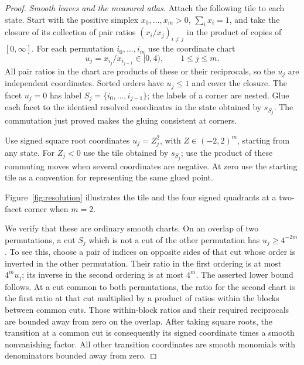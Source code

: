 \begin{proof}
\medskip\noindent\emph{Smooth leaves and the measured atlas.}
Attach the following tile to each state.  Start with the positive
simplex \(x_0,\ldots,x_m>0\), \(\sum_i x_i=1\), and take the closure
of its collection of pair ratios \((x_i/x_j)_{i\ne j}\) in the
product of copies of \([0,\infty]\).  For each permutation
\(i_0,\ldots,i_m\) use the coordinate chart
\begin{equation}\label{eq:transfer-ratios}
                u_j=x_{i_j}/x_{i_{j-1}}\in[0,4),\qquad 1\leq j\leq m.
\end{equation}
All pair ratios in the chart are products of these or their reciprocals,
so the \(u_j\) are independent coordinates.  Sorted orders have
\(u_j\leq1\) and cover the closure.  The facet \(u_j=0\) has label
\(S_j=\{i_0,\ldots,i_{j-1}\}\); the labels of a corner are nested.
Glue each facet to the identical resolved coordinates in the state
obtained by \(s_{S_j}\).  The commutation just proved makes the gluing
consistent at corners.

Use signed square root coordinates \(u_j=Z_j^2\), with
\(Z\in(-2,2)^m\), starting from any state.  For \(Z_j<0\) use the
tile obtained by \(s_{S_j}\); use the product of these commuting moves
when several coordinates are negative.  At zero use the starting tile
as a convention for representing the same glued point.

Figure~\ref{fig:resolution} illustrates the tile and the four signed
quadrants at a two-facet corner when \(m=2\).



We verify that these are ordinary smooth charts.  On an overlap of two permutations,
a cut \(S_j\) which is not a cut of the other permutation has
\(u_j\geq4^{-2m}\).  To see this, choose a pair of indices on opposite
sides of that cut whose order is inverted in the other permutation.
Their ratio in the first ordering is at most \(4^m u_j\); its inverse
in the second ordering is at most \(4^m\).  The asserted lower bound
follows.  At a cut common to both permutations, the ratio for the
second chart is the first ratio at that cut multiplied by a product
of ratios within the blocks between common cuts.  Those within-block
ratios and their required reciprocals are bounded away from zero on
the overlap.  After taking square roots, the transition at a common
cut is consequently its signed coordinate times a smooth nonvanishing
factor.  All other transition coordinates are smooth monomials with
denominators bounded away from zero.


\end{proof}
